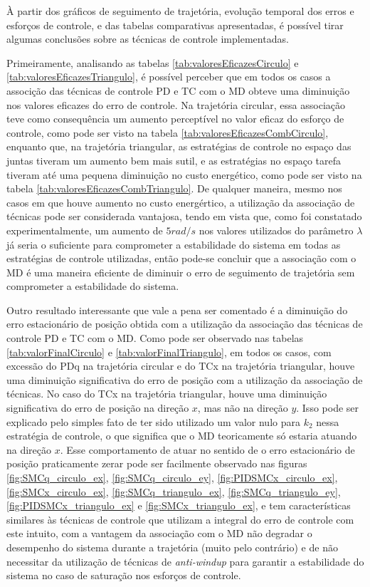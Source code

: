 \documentclass[]{politex}
\begin{document}
À partir dos gráficos de seguimento de trajetória, evolução temporal dos erros e esforços de controle, e das tabelas comparativas apresentadas, é possível tirar algumas conclusões sobre as técnicas de controle implementadas.

Primeiramente, analisando as tabelas \ref{tab:valoresEficazesCirculo} e \ref{tab:valoresEficazesTriangulo}, é possível perceber que em todos os casos a associção das técnicas de controle PD e TC com o MD obteve uma diminuição nos valores eficazes do erro de controle. Na trajetória circular, essa associação teve como consequência um aumento perceptível no valor eficaz do esforço de controle, como pode ser visto na tabela \ref{tab:valoresEficazesCombCirculo}, enquanto que, na trajetória triangular, as estratégias de controle no espaço das juntas tiveram um aumento bem mais sutil, e as estratégias no espaço tarefa tiveram até uma pequena diminuição no custo energético, como pode ser visto na tabela \ref{tab:valoresEficazesCombTriangulo}. De qualquer maneira, mesmo nos casos em que houve aumento no custo energértico, a utilização da associação de técnicas pode ser considerada vantajosa, tendo em vista que, como foi constatado experimentalmente, um aumento de $5rad/s$ nos valores utilizados do parâmetro $\lambda$  já seria o suficiente para comprometer a estabilidade do sistema em todas as estratégias de controle utilizadas, então pode-se concluir que a associação com o MD é uma maneira eficiente de diminuir o erro de seguimento de trajetória sem comprometer a estabilidade do sistema.  

Outro resultado interessante que vale a pena ser comentado é a diminuição do erro estacionário de posição obtida com a utilização da associação das técnicas de controle PD e TC com o MD. Como pode ser observado nas tabelas \ref{tab:valorFinalCirculo} e \ref{tab:valorFinalTriangulo}, em todos os casos, com excessão do PDq na trajetória circular e do TCx na trajetória triangular, houve uma diminuição significativa do erro de posição com a utilização da associação de técnicas. No caso do TCx na trajetória triangular, houve uma diminuição significativa do erro de posição na direção $x$, mas não na direção $y$. Isso pode ser explicado pelo simples fato de ter sido utilizado um valor nulo para $k_2$ nessa estratégia de controle, o que significa que o MD teoricamente só estaria atuando na direção $x$. Esse comportamento de atuar no sentido de o erro estacionário de posição praticamente zerar pode ser facilmente observado nas figuras \ref{fig:SMCq_circulo_ex}, \ref{fig:SMCq_circulo_ey}, \ref{fig:PIDSMCx_circulo_ex}, \ref{fig:SMCx_circulo_ex}, \ref{fig:SMCq_triangulo_ex}, \ref{fig:SMCq_triangulo_ey}, \ref{fig:PIDSMCx_triangulo_ex} e \ref{fig:SMCx_triangulo_ex}, e tem características similares às técnicas de controle que utilizam a integral do erro de controle com este intuito, com a vantagem da associação com o MD não degradar o desempenho do sistema durante a trajetória (muito pelo contrário) e de não necessitar da utilização de técnicas de \emph{anti-windup} para garantir a estabilidade do sistema no caso de saturação nos esforços de controle.
\end{document}

